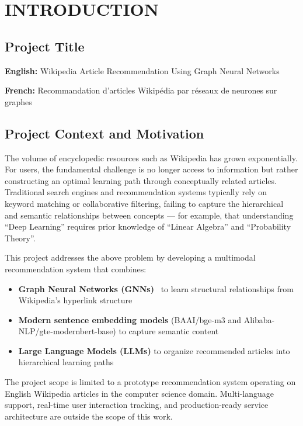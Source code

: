 \chapter{INTRODUCTION}
\thispagestyle{empty}

\section{Project Title}

\textbf{English:} Wikipedia Article Recommendation Using Graph Neural Networks

\textbf{French:} Recommandation d'articles Wikipédia par réseaux de neurones sur graphes

\section{Project Context and Motivation}

The volume of encyclopedic resources such as Wikipedia has grown exponentially. For users, the fundamental challenge is no longer access to information but rather constructing an optimal learning path through conceptually related articles. Traditional search engines and recommendation systems typically rely on keyword matching or collaborative filtering, failing to capture the hierarchical and semantic relationships between concepts --- for example, that understanding ``Deep Learning'' requires prior knowledge of ``Linear Algebra'' and ``Probability Theory''.

This project addresses the above problem by developing a multimodal recommendation system that combines:
\begin{itemize}
    \item \textbf{Graph Neural Networks (GNNs)}~\cite{kipf2017semi,velickovic2018graph} to learn structural relationships from Wikipedia's hyperlink structure
    \item \textbf{Modern sentence embedding models} (BAAI/bge-m3 and Alibaba-NLP/gte-modernbert-base) to capture semantic content
    \item \textbf{Large Language Models (LLMs)} to organize recommended articles into hierarchical learning paths
\end{itemize}

The project scope is limited to a prototype recommendation system operating on English Wikipedia articles in the computer science domain. Multi-language support, real-time user interaction tracking, and production-ready service architecture are outside the scope of this work.

